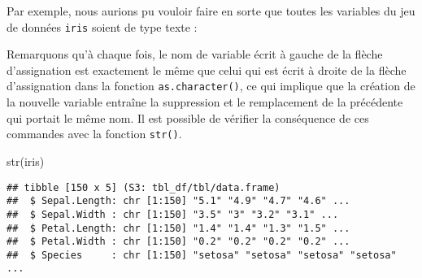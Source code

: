 \documentclass[
]{book}
\newenvironment{Shaded}{\begin{snugshade}}{\end{snugshade}}
\newcommand{\AttributeTok}[1]{\textcolor[rgb]{0.77,0.63,0.00}{#1}}
\newcommand{\FunctionTok}[1]{\textcolor[rgb]{0.00,0.00,0.00}{#1}}
\newcommand{\NormalTok}[1]{#1}
\newcommand{\OtherTok}[1]{\textcolor[rgb]{0.56,0.35,0.01}{#1}}
\newcommand{\SpecialCharTok}[1]{\textcolor[rgb]{0.00,0.00,0.00}{#1}}
\begin{document}
Par exemple, nous aurions pu vouloir faire en sorte que toutes les variables du jeu de données \texttt{iris} soient de type texte :

\begin{Shaded}
\end{Shaded}

Remarquons qu'à chaque fois, le nom de variable écrit à gauche de la flèche d'assignation est exactement le même que celui qui est écrit à droite de la flèche d'assignation dans la fonction \texttt{as.character()}, ce qui implique que la création de la nouvelle variable entraîne la suppression et le remplacement de la précédente qui portait le même nom. Il est possible de vérifier la conséquence de ces commandes avec la fonction \texttt{str()}.

\begin{Shaded}
\begin{Highlighting}[]
\FunctionTok{str}\NormalTok{(iris)}
\end{Highlighting}
\end{Shaded}

\begin{verbatim}
## tibble [150 x 5] (S3: tbl_df/tbl/data.frame)
##  $ Sepal.Length: chr [1:150] "5.1" "4.9" "4.7" "4.6" ...
##  $ Sepal.Width : chr [1:150] "3.5" "3" "3.2" "3.1" ...
##  $ Petal.Length: chr [1:150] "1.4" "1.4" "1.3" "1.5" ...
##  $ Petal.Width : chr [1:150] "0.2" "0.2" "0.2" "0.2" ...
##  $ Species     : chr [1:150] "setosa" "setosa" "setosa" "setosa" ...
\end{verbatim}
\end{document}
